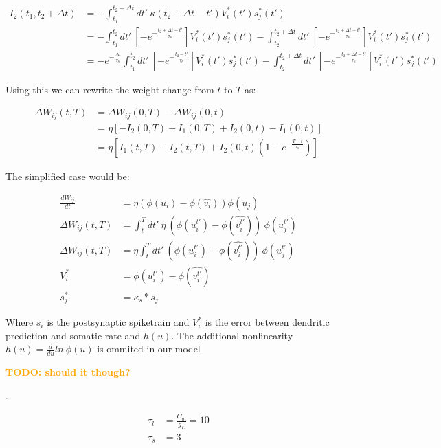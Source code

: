 \documentclass[12pt,a4paper,titlepage]{report}
\newcommand{\todo}[1] {\textcolor{orange}{\textbf{TODO: #1} \addcontentsline{toc}{subsection}{\textcolor{orange}{TODO: #1}}
}}
\begin{document}
\begin{align}
I_2 (t_1, t_2 + \Delta t) &= -\int_{t_1}^{t_2 + \Delta t} dt' \ \tilde{\kappa} (t_2 + \Delta t - t') V_i^\ast (t') s_j^\ast (t')\\
&= -\int_{t_1}^{t_2} dt' \ \left[ -e^{- \frac{t_2 + \Delta t - t'}{\tau_\kappa}} \right] V_i^\ast (t') s_j^\ast (t') 
 -\int_{t_2}^{t_2 + \Delta t} dt' \ \left[ -e^{- \frac{t_2 + \Delta t - t'}{\tau_\kappa}} \right] V_i^\ast (t') s_j^\ast (t')\\
 &= -e^{- \frac{ \Delta t}{\tau_\kappa}} \int_{t_1}^{t_2} dt' \ \left[ -e^{- \frac{t_2 - t'}{\tau_\kappa}} \right] V_i^\ast (t') s_j^\ast (t') 
 -\int_{t_2}^{t_2 + \Delta t} dt' \ \left[ -e^{- \frac{t_2 + \Delta t - t'}{\tau_\kappa}} \right] V_i^\ast (t') s_j^\ast (t')
\end{align}


Using this we can rewrite the weight change from $t$ to $T$ as:


\begin{align*}
\Delta W_{ij}(t,T) &= \Delta W_{ij}(0,T) - \Delta W_{ij}(0,t)\\
&= \eta [-I_2(0,T) + I_1(0,T) + I_2(0,t) - I_1(0,t)]\\
&= \eta [I_1(t,T) - I_2(t,T) + I_2(0,t)\left( 1 - e^{- \frac{T-t}{\tau_\kappa}} \right)]
\end{align*}

The simplified \cite{sacramento2018dendritic} case would be:

\begin{align*}
\frac{dW_{ij}}{dt} &= \eta (\phi(u_i) - \phi(\hat{v_i})) \phi(u_j)\\
\Delta W_{ij}(t,T) &= \int_t^T dt' \ \eta \  (\phi(u_i^{t'}) - \phi(\widehat{v_i^{t'}})) \  \phi(u_j^{t'})\\
\Delta W_{ij}(t,T) &= \eta \int_t^T dt' \  (\phi(u_i^{t'}) - \phi(\widehat{v_i^{t'}})) \ \phi(u_j^{t'})\\
V_i^* &= \phi(u_i^{t'}) - \phi(\widehat{v_i^{t'}})\\
s_j^* &= \kappa_s * s_j
\end{align*}


Where $s_i$ is the postsynaptic spiketrain and $V_i^*$ is the error between dendritic prediction and somatic rate and $h( u )$. The additional nonlinearity $h( u ) = \frac{d}{du} ln \  \phi(u)$ is ommited in our model \todo{should it though?}.



\begin{align}
\tau_l &= \frac{C_m}{g_L} = 10\\
\tau_s &= 3
\end{align}
\end{document}
